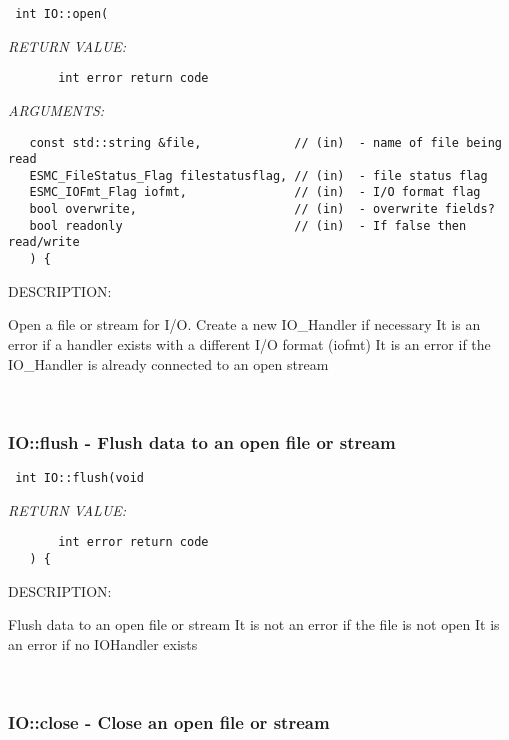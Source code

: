   
\begin{verbatim} int IO::open(\end{verbatim}{\em RETURN VALUE:}
\begin{verbatim}       int error return code\end{verbatim}{\em ARGUMENTS:}
\begin{verbatim} 
   const std::string &file,             // (in)  - name of file being read
   ESMC_FileStatus_Flag filestatusflag, // (in)  - file status flag
   ESMC_IOFmt_Flag iofmt,               // (in)  - I/O format flag
   bool overwrite,                      // (in)  - overwrite fields?
   bool readonly                        // (in)  - If false then read/write
   ) {\end{verbatim}
{\sf DESCRIPTION:\\ }


        Open a file or stream for I/O. Create a new IO_Handler if necessary
        It is an error if a handler exists with a different I/O format (iofmt)
        It is an error if the IO_Handler is already connected to an open stream
   
 
\mbox{}\hrulefill\ 
 
\subsubsection [IO::flush] {IO::flush - Flush data to an open file or stream}


  
\begin{verbatim} int IO::flush(void\end{verbatim}{\em RETURN VALUE:}
\begin{verbatim}       int error return code
   ) {\end{verbatim}
{\sf DESCRIPTION:\\ }


        Flush data to an open file or stream
        It is not an error if the file is not open
        It is an error if no IOHandler exists
   
 
\mbox{}\hrulefill\ 
 
\subsubsection [IO::close] {IO::close - Close an open file or stream}


